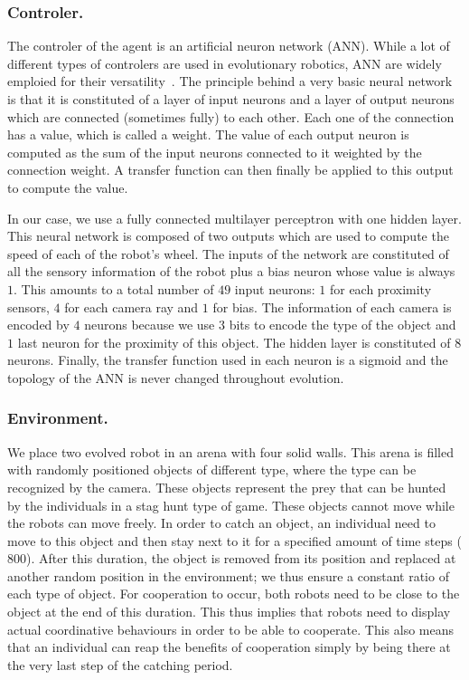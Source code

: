     \subsubsection{Controler.} The controler of the agent is an artificial neuron network (ANN). While a lot of different types of controlers are used in evolutionary robotics, ANN are widely emploied for their versatility~\cite{Doncieux2015}. The principle behind a very basic neural network is that it is constituted of a layer of input neurons and a layer of output neurons which are connected (sometimes fully) to each other. Each one of the connection has a value, which is called a weight. The value of each output neuron is computed as the sum of the input neurons connected to it weighted by the connection weight. A transfer function can then finally be applied to this output to compute the value. 

    In our case, we use a fully connected multilayer perceptron with one hidden layer. This neural network is composed of two outputs which are used to compute the speed of each of the robot's wheel. The inputs of the network are constituted of all the sensory information of the robot plus a bias neuron whose value is always $1$. This amounts to a total number of $49$ input neurons: $1$ for each proximity sensors, $4$ for each camera ray and $1$ for bias. The information of each camera is encoded by $4$ neurons because we use $3$ bits to encode the type of the object and $1$ last neuron for the proximity of this object. The hidden layer is constituted of $8$ neurons. Finally, the transfer function used in each neuron is a sigmoid and the topology of the ANN is never changed throughout evolution.

    \subsubsection{Environment.} We place two evolved robot in an arena with four solid walls. This arena is filled with randomly positioned objects of different type, where the type can be recognized by the camera. These objects represent the prey that can be hunted by the individuals in a stag hunt type of game. These objects cannot move while the robots can move freely. In order to catch an object, an individual need to move to this object and then stay next to it for a specified amount of time steps ($800$). After this duration, the object is removed from its position and replaced at another random position in the environment; we thus ensure a constant ratio of each type of object. For cooperation to occur, both robots need to be close to the object at the end of this duration. This thus implies that robots need to display actual coordinative behaviours in order to be able to cooperate. This also means that an individual can reap the benefits of cooperation simply by being there at the very last step of the catching period.


